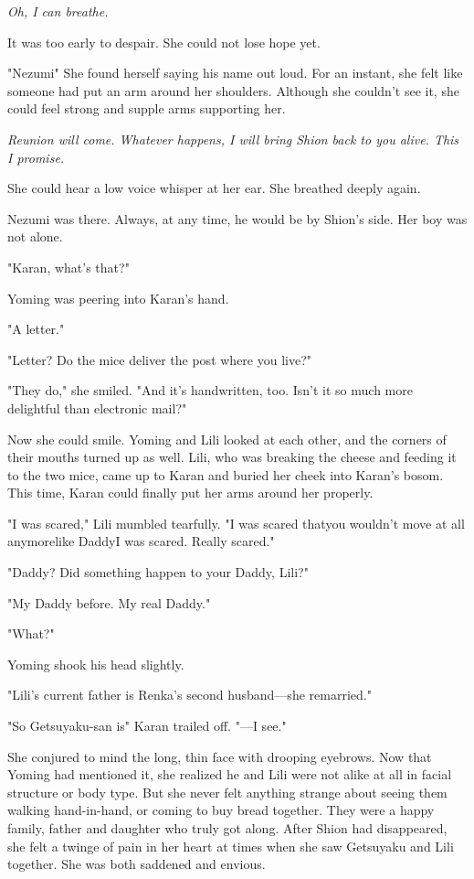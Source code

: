 \emph{Oh, I can breathe.}

It was too early to despair. She could not lose hope yet.

"Nezumi\el " She found herself saying his name out loud. For an instant,
she felt like someone had put an arm around her shoulders. Although she
couldn't see it, she could feel strong and supple arms supporting her.

\emph{Reunion will come. Whatever happens, I will bring Shion back to you
alive. This I promise.}

She could hear a low voice whisper at her ear. She breathed deeply
again.

Nezumi was there. Always, at any time, he would be by Shion's side. Her
boy was not alone.

"Karan, what's that?"

Yoming was peering into Karan's hand.

"A letter."

"Letter? Do the mice deliver the post where you live?"

"They do," she smiled. "And it's handwritten, too. Isn't it so much more
delightful than electronic mail?"

Now she could smile. Yoming and Lili looked at each other, and the
corners of their mouths turned up as well. Lili, who was breaking the
cheese and feeding it to the two mice, came up to Karan and buried her
cheek into Karan's bosom. This time, Karan could finally put her arms
around her properly.

"I was scared," Lili mumbled tearfully. "I was scared that\el you
wouldn't move at all anymore\el like Daddy\el I was scared. Really
scared."

"Daddy? Did something happen to your Daddy, Lili?"

"My Daddy before. My real Daddy."

"What?"

Yoming shook his head slightly.

"Lili's current father is Renka's second husband---she remarried."

"So Getsuyaku-san is\el " Karan trailed off. "---I see."

She conjured to mind the long, thin face with drooping eyebrows. Now
that Yoming had mentioned it, she realized he and Lili were not alike at
all in facial structure or body type. But she never felt anything
strange about seeing them walking hand-in-hand, or coming to buy bread
together. They were a happy family, father and daughter who truly got
along. After Shion had disappeared, she felt a twinge of pain in her
heart at times when she saw Getsuyaku and Lili together. She was both
saddened and envious.

